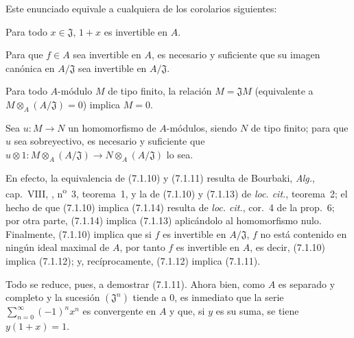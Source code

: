 Este enunciado equivale a cualquiera de los corolarios siguientes:

\begin{corollary}[7.1.11]
\label{0.7.1.11-fr}
Para todo $x\in\mathfrak J$, $1+x$ es invertible en $A$.
\end{corollary}

\begin{corollary}[7.1.12]
\label{0.7.1.12-fr}
Para que $f\in A$ sea invertible en $A$, es necesario y suficiente que su imagen
canónica en $A/\mathfrak J$ sea invertible en $A/\mathfrak J$.
\end{corollary}

\begin{corollary}[7.1.13]
\label{0.7.1.13-fr}
Para todo $A$-módulo $M$ de tipo finito, la relación $M=\mathfrak JM$
(equivalente a $M\otimes_A(A/\mathfrak J)=0$) implica $M=0$.
\end{corollary}

\begin{corollary}[7.1.14]
\label{0.7.1.14-fr}
Sea $u:M\to N$ un homomorfismo de $A$-módulos, siendo $N$ de tipo finito;
para que $u$ sea sobreyectivo, es necesario y suficiente que
$u\otimes1:M\otimes_A(A/\mathfrak J)\to N\otimes_A(A/\mathfrak J)$ lo sea.
\end{corollary}

En efecto, la equivalencia de (7.1.10) y (7.1.11) resulta de Bourbaki,
\emph{Alg.}, cap.~VIII, , n\textsuperscript{o}~3, teorema~1, y
la de (7.1.10) y (7.1.13) de \emph{loc. cit.}, teorema~2; el hecho de que
(7.1.10) implica (7.1.14) resulta de \emph{loc. cit.}, cor.~4 de la prop.~6;
por otra parte, (7.1.14) implica (7.1.13) aplicándolo al homomorfismo nulo.
Finalmente, (7.1.10) implica que si $f$ es invertible en $A/\mathfrak J$, $f$
no está contenido en ningún ideal maximal de $A$, por tanto $f$ es invertible en
$A$, es decir, (7.1.10) implica (7.1.12); y, recíprocamente, (7.1.12)
implica (7.1.11).

Todo se reduce, pues, a demostrar (7.1.11). Ahora bien, como $A$ es separado y completo y
la sucesión $(\mathfrak J^n)$ tiende a $0$, es inmediato que la serie
$\sum_{n=0}^{\infty}(-1)^n x^n$ es convergente en $A$ y que, si $y$ es
su suma, se tiene $y(1+x)=1$.


